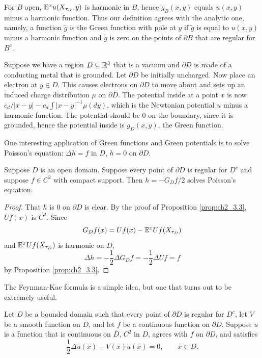 For $B$ open, $\mathbb{E}^xu(X_{\tau_B},y)$ is harmonic in $B$, hence $g_B(x,y)$ equals $u(x,y)$ minus a harmonic function. Thus our definition agrees with the analytic one, namely, a function $\widetilde{g}$ is the Green function with pole at $y$ if $\widetilde{g}$ is equal to $u(x,y)$ minus a harmonic function and $\widetilde{g}$ is zero on the points of $\partial B$ that are regular for $B^c$.

\mpagebreak

Suppose we have a region $D \subseteq \mathbb{R}^3$ that is a vacuum and $\partial D$ is made of a conducting metal that is grounded. Let $\partial D$ be initially uncharged. Now place an electron at $y \in D$. This causes electrons on $\partial D$ to move about and sets up an induced charge distribution $\mu$ on $\partial D$. The potential inside at a point $x$ is now $c_d/|x-y| - c_d\int |x-y|^{-1}\mu(dy)$, which is the Newtonian potential $u$ minus a harmonic function. The potential should be $0$ on the boundary, since it is grounded, hence the potential inside is $g_D(x,y)$, the Green function.

One interesting application of Green functions and Green potentials is to solve Poisson's equation: $\Delta h = f$ in $D$, $h = 0$ on $\partial D$.

\begin{proposition}\label{prop:ch2_3.6}
Suppose $D$ is an open domain. Suppose every point of $\partial D$ is regular for $D^c$ and suppose $f \in C^2$ with compact support. Then $h = -G_Df/2$ solves Poisson's equation.
\end{proposition}

\begin{proof}
That $h$ is $0$ on $\partial D$ is clear. By the proof of Proposition \ref{prop:ch2_3.3}, $Uf(x)$ is $C^2$. Since
\[
    G_Df(x) = Uf(x) - \mathbb{E}^xUf(X_{\tau_D})
\]
and $\mathbb{E}^xUf(X_{\tau_D})$ is harmonic on $D$,
\[
    \Delta h = -\frac{1}{2}\Delta G_Df = -\frac{1}{2}\Delta Uf = f
\]
by Proposition \ref{prop:ch2_3.3}.
\end{proof}



The Feynman-Kac formula is a simple idea, but one that turns out to be extremely useful.

Let $D$ be a bounded domain such that every point of $\partial D$ is regular for $D^c$, let $V$ be a smooth function on $D$, and let $f$ be a continuous function on $\partial D$. Suppose $u$ is a function that is continuous on $\overline{D}$, $C^2$ in $D$, agrees with $f$ on $\partial D$, and satisfies
\begin{equation}\label{eq:ch2_3.17}
    \frac{1}{2}\Delta u(x) - V(x)u(x) = 0, \qquad x \in D.
\end{equation}


